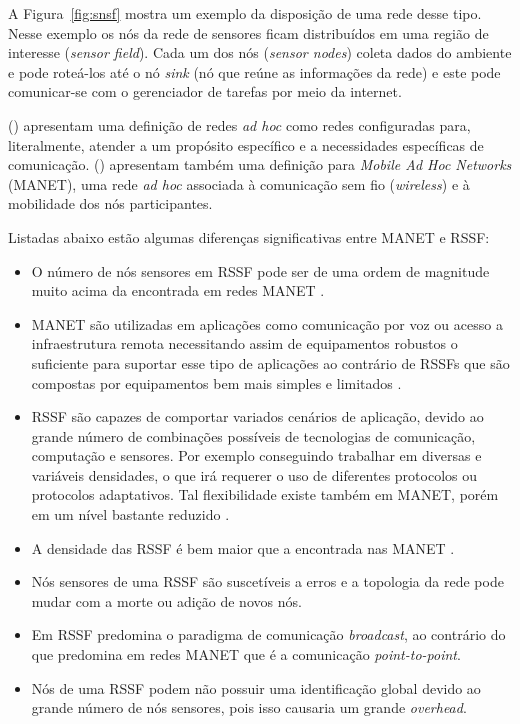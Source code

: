 A Figura~\ref{fig:snsf} mostra um exemplo da disposição de uma rede desse tipo. Nesse exemplo os nós da rede de sensores ficam distribuídos em uma região de interesse (\textit{sensor field}). Cada um dos nós (\textit{sensor nodes}) coleta dados do ambiente e pode roteá-los até o nó \textit{sink} (nó que reúne as informações da rede) e este pode comunicar-se com o gerenciador de tarefas por meio da internet.

 (\citeyear{Karl2005}) apresentam uma definição de redes \textit{ad hoc} como redes configuradas para, literalmente, atender a um propósito específico e a necessidades específicas de comunicação.  (\citeyear{Karl2005}) apresentam também uma definição para \textit{Mobile Ad Hoc Networks} (MANET), uma rede \textit{ad hoc} associada à comunicação sem fio (\textit{wireless}) e à mobilidade dos nós participantes. 


Listadas abaixo estão algumas diferenças significativas entre MANET e RSSF:
\begin{itemize} 
	\item O número de nós sensores em RSSF pode ser de uma ordem de magnitude muito acima da encontrada em redes MANET \cite{Akyildiz2002}.
	\item MANET são utilizadas em aplicações como comunicação por voz ou acesso a infraestrutura remota necessitando assim de equipamentos robustos o suficiente para suportar esse tipo de aplicações ao contrário de RSSFs que são compostas por equipamentos bem mais simples e limitados \cite{Karl2005}. 
	\item RSSF são capazes de comportar variados cenários de aplicação, devido ao grande número de combinações possíveis de tecnologias de comunicação, computação e sensores. Por exemplo conseguindo trabalhar em diversas e variáveis densidades, o que irá requerer o uso de diferentes protocolos ou protocolos adaptativos. Tal flexibilidade existe também em MANET, porém em um nível bastante reduzido \cite{Karl2005}. 
	\item A densidade das RSSF é bem maior que a encontrada nas MANET \cite{Akyildiz2002}.
	\item Nós sensores de uma RSSF são suscetíveis a erros e a topologia da rede pode mudar com a morte ou adição de novos nós\cite{Akyildiz2002}. 
	\item Em RSSF predomina o paradigma de comunicação \textit{broadcast}, ao contrário do que predomina em redes MANET que é a comunicação \textit{point-to-point}.
	\item Nós de uma RSSF podem não possuir uma identificação global devido ao grande número de nós sensores, pois isso causaria um grande \textit{overhead}.
\end{itemize} 

